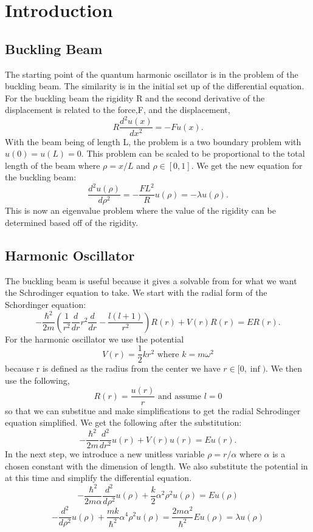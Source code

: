 \documentclass[%
 reprint,
 amsmath,amssymb,
 aps,
]{revtex4-1}
\begin{document}

\section{\label{sec:level1}Introduction}
\subsection{Buckling Beam}
The starting point of the quantum harmonic oscillator is in the problem of the buckling beam. The similarity is in the initial set up of the differential equation. For the buckling beam the rigidity R and the second derivative of the displacement is related to the force,F, and the displacement,
\[ R \frac{d^2 u(x)}{dx^2} = -F u(x). \]
With the beam being of length L, the problem is a two boundary problem with $u(0) = u(L) = 0$. This problem can be scaled to be proportional to the total length of the beam where $ \rho = x/L $ and $ \rho \in [0,1]$. We get the new equation for the buckling beam:
\[ \frac{d^2 u(\rho)}{d\rho^2} = -\frac{FL^2}{R}u(\rho) = -\lambda u(\rho). \]
This is now an eigenvalue problem where the value of the rigidity can be determined based off of the rigidity. \\
\subsection{Harmonic Oscillator}
The buckling beam is useful because it gives a solvable from for what we want the Schrodinger equation to take. We start with the radial form of the Schordinger equation:
\[ -\frac{\hbar^2}{2 m} \left ( \frac{1}{r^2} \frac{d}{dr} r^2
  \frac{d}{dr} - \frac{l (l + 1)}{r^2} \right )R(r) 
     + V(r) R(r) = E R(r). \]
For the harmonic oscillator we use the potential
\[ V(r) = \frac{1}{2}kr^2 \text{ where } k = m \omega^2\]
because r is defined as the radius from the center we have $r \in [0,\inf)$. We then use the following, 
\[ R(r) = \frac{u(r)}{r} \text{ and assume } l = 0 \]
so that we can substitue and make simplifications to get the radial Schrodinger equation simplified. We get the following after the substitution:
\[ -\frac{\hbar^2}{2 m} \frac{d^2}{dr^2} u(r) + V(r) u(r) = E u(r). \]
In the next step, we introduce a new unitless variable $\rho = r/ \alpha$ where $\alpha$ is a chosen constant with the dimension of length. We also substitute the potential in at this time and simplify the differential equation.
\[ -\frac{\hbar^2}{2 m \alpha} \frac{d^2}{d\rho^2} u(\rho) + \frac{k}{2}\alpha^2 \rho^2  u(\rho) = E u(\rho) 
\]
\[-\frac{d^2}{d\rho^2} u(\rho) + \frac{mk}{\hbar^2}\alpha^4 \rho^2 u(\rho) = \frac{2m\alpha^2}{\hbar^2} E u(\rho) = \lambda u(\rho)\]
\end{document}
